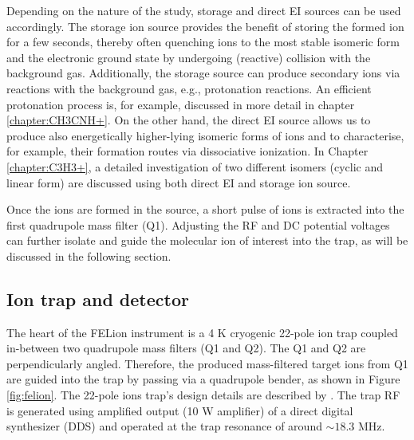 Depending on the nature of the study, storage and direct EI sources can be used accordingly. The storage ion source provides the benefit of storing the formed ion for a few seconds, thereby often quenching ions to the most stable isomeric form  and the electronic ground state by undergoing (reactive) collision with the background gas. Additionally, the storage source can produce secondary ions via reactions with the background gas, e.g., protonation reactions. An efficient protonation process is, for example, discussed in more detail in chapter \ref{chapter:CH3CNH+}. On the other hand, the direct EI source allows us to produce also energetically higher-lying isomeric forms of ions and to characterise, for example, their formation routes via dissociative ionization. In Chapter \ref{chapter:C3H3+}, a detailed investigation of two different isomers (cyclic and linear form) are discussed using both direct EI and storage ion source.

Once the ions are formed in the source, a short pulse of ions is extracted into the first quadrupole mass filter (Q1). Adjusting the RF and DC potential voltages can further isolate and guide the molecular ion of interest into the trap, as will be discussed in the following section.

\subsection{Ion trap and detector}
\label{subsec:setup:ion-trap-and-detector}

The heart of the FELion instrument is a 4 K cryogenic 22-pole ion trap coupled in-between two quadrupole mass filters (Q1 and Q2). The Q1 and Q2 are perpendicularly angled. Therefore, the produced mass-filtered target ions from Q1 are guided into the trap by passing via a quadrupole bender, as shown in Figure \ref{fig:felion}. The 22-pole ions trap's design details are described by \citet{asvany_note_2010}. The trap RF is generated using amplified output (10 W amplifier) of a direct digital synthesizer (DDS) and operated at the trap resonance of around $\sim 18.3$ MHz. 

